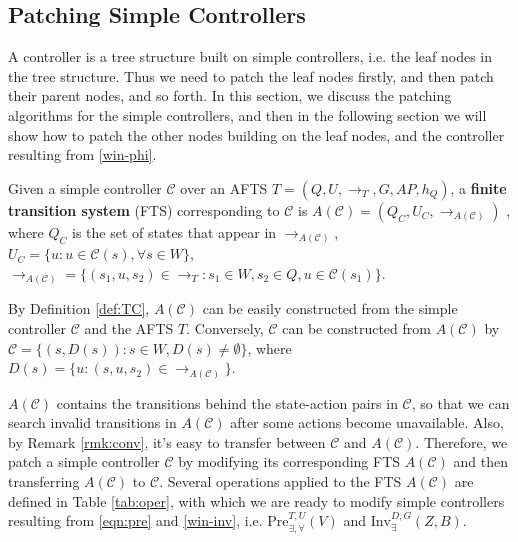 

\subsection{Patching Simple Controllers}
\label{sec:patch-simple}
A controller is a tree structure built on simple controllers, i.e. the leaf nodes in the tree structure. Thus we need to patch the leaf nodes firstly, and then patch their parent nodes, and so forth.  In this section, we discuss the patching algorithms for the simple controllers, and then in the following section we will show how to patch the other nodes building on the leaf nodes, and the controller resulting from \eqref{win-phi}. 

\begin{definition}
	Given a simple controller $ \mathcal{C} $ over an AFTS $T = (Q,U,\rightarrow_T, G,AP,h_Q) $, a \textbf{finite transition system} (FTS) corresponding to $ \mathcal{C} $ is $A(\mathcal{C}) = (Q_C, U_C, \rightarrow_{A(\mathcal{C})})$ %
	, where $ Q_C $ is the set of states that appear in $ \rightarrow_{A(\mathcal{C})} $, $ U_C=\{u: u\in \mathcal{C}(s), \forall s\in W\} $, $ \rightarrow_{A(\mathcal{C})} =\{(s_1,u,s_2)\in \rightarrow_T: s_1\in W,s_2\in Q, u\in \mathcal{C}(s_1)\} $. \label{def:TC}
\end{definition}

\begin{remark}
	By Definition \ref{def:TC}, $ A(\mathcal{C}) $ can be easily constructed from the simple controller $ \mathcal{C} $ and the AFTS $ T $. Conversely, $ \mathcal{C} $ can be constructed from $ A(\mathcal{C}) $ by $ \mathcal{C} = \{(s,D(s)):s\in W,D(s)\not=\emptyset\} $, where $ D(s)=\{u:(s,u,s_2)\in \rightarrow_{A(\mathcal{C})}\} $.\label{rmk:conv}
\end{remark}
{\color{teal} $ A(\mathcal{C}) $ contains the transitions behind the state-action pairs in $ \mathcal{C} $, so that we can search invalid transitions in $ A(\mathcal{C}) $ after some actions become unavailable. Also, by Remark \ref{rmk:conv}, it's easy to transfer between  $ \mathcal{C} $ and $ A(\mathcal{C}) $.} Therefore, we patch a simple controller $ \mathcal{C} $ by modifying its corresponding FTS $ A(\mathcal{C}) $ and then transferring $ A(\mathcal{C}) $ to $ \mathcal{C} $. Several operations applied to the FTS $ A(\mathcal{C}) $ are defined in Table \ref{tab:oper}, with which we are ready to modify simple controllers resulting from \eqref{eqn:pre} and \eqref{win-inv}, i.e. $ \text{Pre}_{\exists,\forall}^{T, U}(V) $ and $ \text{Inv}_{\exists}^{D,G}(Z,B) $. %

